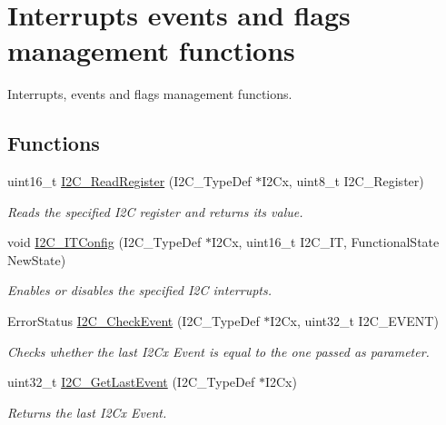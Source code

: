 \hypertarget{group___i2_c___group5}{\section{Interrupts events and flags management functions}
\label{group___i2_c___group5}
}


Interrupts, events and flags management functions.  


\subsection*{Functions}
\begin{DoxyCompactItemize}
\item 
uint16\-\_\-t \hyperlink{group___i2_c___group5_ga8021dc796d15f997356b0583d6346805}{I2\-C\-\_\-\-Read\-Register} (I2\-C\-\_\-\-Type\-Def $\ast$I2\-Cx, uint8\-\_\-t I2\-C\-\_\-\-Register)
\begin{DoxyCompactList}\small\item\em Reads the specified I2\-C register and returns its value. \end{DoxyCompactList}\item 
void \hyperlink{group___i2_c___group5_ga58fed146a06cb81d2940604e460de047}{I2\-C\-\_\-\-I\-T\-Config} (I2\-C\-\_\-\-Type\-Def $\ast$I2\-Cx, uint16\-\_\-t I2\-C\-\_\-\-I\-T, Functional\-State New\-State)
\begin{DoxyCompactList}\small\item\em Enables or disables the specified I2\-C interrupts. \end{DoxyCompactList}\item 
Error\-Status \hyperlink{group___i2_c___group5_ga2d5701342f9d4c1f09bf9d3cdcacc326}{I2\-C\-\_\-\-Check\-Event} (I2\-C\-\_\-\-Type\-Def $\ast$I2\-Cx, uint32\-\_\-t I2\-C\-\_\-\-E\-V\-E\-N\-T)
\begin{DoxyCompactList}\small\item\em Checks whether the last I2\-Cx Event is equal to the one passed as parameter. \end{DoxyCompactList}\item 
uint32\-\_\-t \hyperlink{group___i2_c___group5_ga29237aea9b5a3ead33167e1d027e9f1a}{I2\-C\-\_\-\-Get\-Last\-Event} (I2\-C\-\_\-\-Type\-Def $\ast$I2\-Cx)
\begin{DoxyCompactList}\small\item\em Returns the last I2\-Cx Event. \end{DoxyCompactList}\item 

\end{DoxyCompactItemize}
